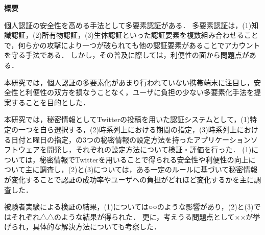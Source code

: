 \thispagestyle{empty}

\noindent
\begin{center}
\LARGE \bf 概要\\
\end{center}

\vspace{1.0cm}
{\small}
\normalsize

個人認証の安全性を高める手法として多要素認証がある．
多要素認証は，(1)知識認証，(2)所有物認証，(3)生体認証といった認証要素を複数組み合わせることで，何らかの攻撃により一つが破られても他の認証要素があることでアカウントを守る手法である．
しかし，その普及に際しては，利便性の面から問題点がある．

本研究では，個人認証の多要素化があまり行われていない携帯端末に注目し，安全性と利便性の双方を損なうことなく，ユーザに負担の少ない多要素化手法を提案することを目的とした．

本研究では，秘密情報としてTwitterの投稿を用いた認証システムとして，(1)特定の一つを自ら選択する，(2)時系列上における期間の指定，(3)時系列上における日付と曜日の指定，の3つの秘密情報の設定方法を持ったアプリケーションソフトウェアを開発し，それぞれの設定方法について検証・評価を行った．
(1)については，秘密情報でTwitterを用いることで得られる安全性や利便性の向上について主に調査し，(2)と(3)については，ある一定のルールに基づいて秘密情報が変化することで認証の成功率やユーザへの負担がどれほど変化するかを主に調査した．

被験者実験による検証の結果，(1)については○○のような影響があり，(2)と(3)ではそれぞれ△△のような結果が得られた．
更に，考えうる問題点として××が挙げられ，具体的な解決方法についても考察した．



\newpage
